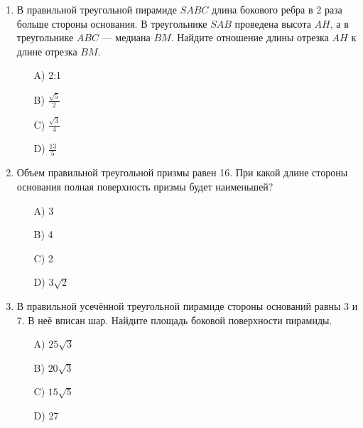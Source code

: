\documentclass[12pt]{article}
\begin{document}
\begin{enumerate}
\item В правильной треугольной пирамиде \(SABC\) длина бокового ребра в 2 раза больше стороны основания. В треугольнике \(SAB\) проведена высота \(AH\), а в треугольнике \(ABC\) — медиана \(BM\). Найдите отношение длины отрезка \(AH\) к длине отрезка \(BM\). \\
\textbf{}
\begin{enumerate}
    \item[A)] 2:1
    \item[B)] \(\frac{\sqrt{5}}{2}\)
    \item[C)] \(\frac{\sqrt{3}}{4}\)
    \item[D)] \(\frac{13}{5}\)
\end{enumerate}

\vspace{0.cm} %

\item Объем правильной треугольной призмы равен 16. При какой длине стороны основания полная поверхность призмы будет наименьшей? \\
\textbf{}
\begin{enumerate}
    \item[A)] 3
    \item[B)] 4
    \item[C)] 2
    \item[D)] \(3\sqrt{2}\)
\end{enumerate}

\vspace{0.cm} %
\item В правильной усечённой треугольной пирамиде стороны оснований равны 3 и
7. В неё вписан шар. Найдите площадь боковой поверхности пирамиды.
\begin{enumerate}
    \item[A)] \(25\sqrt{3}\)
    \item[B)] \(20\sqrt{3}\)
    \item[C)] \(15\sqrt{5}\)
    \item[D)] 27
\end{enumerate}

\end{enumerate}
\end{document}
